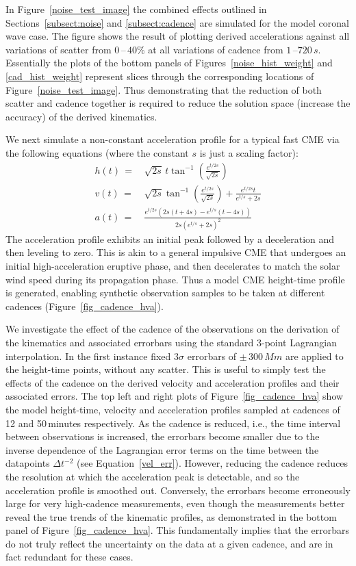 \documentclass[structabstract]{aa}
\begin{document}
In Figure~\ref{noise_test_image} the combined effects outlined in Sections~\ref{subsect:noise} and \ref{subsect:cadence} are simulated for the model coronal wave case. The figure shows the result of plotting derived accelerations against all variations of scatter from $0$\,--\,$40\%$ at all variations of cadence from $1$\,--$720\,s$. Essentially the plots of the bottom panels of Figures~\ref{noise_hist_weight} and \ref{cad_hist_weight} represent slices through the corresponding locations of Figure~\ref{noise_test_image}. Thus demonstrating that the reduction of both scatter and cadence together is required to reduce the solution space (increase the accuracy) of the derived kinematics.

We next simulate a non-constant acceleration profile for a typical fast CME via the following equations (where the constant $s$ is just a scaling factor):
\begin{eqnarray}
h(t)\,=&\,\sqrt{2s}\,t\tan^{-1}\left(\frac{e^{t/2s}}{\sqrt{2s}}\right) \\
v(t)\,=&\,\sqrt{2s}\tan^{-1}\left(\frac{e^{t/2s}}{\sqrt{2s}}\right)+\frac{e^{t/2s}t}{e^{t/s}+2s} \\
a(t)\,=&\,\frac{e^{t/2s}\left(2s\left(t+4s\right)-e^{t/s}\left(t-4s\right)\right)}{2s\left(e^{t/s}+2s\right)^2}
\label{eqn:nonconst_a}
\end{eqnarray}
The acceleration profile exhibits an initial peak followed by a deceleration and then leveling to zero. This is akin to a general impulsive CME that undergoes an initial high-acceleration eruptive phase, and then decelerates to match the solar wind speed during its propagation phase. Thus a model CME height-time profile is generated, enabling synthetic observation samples to be taken at different cadences (Figure~\ref{fig_cadence_hva}). 

We investigate the effect of the cadence of the observations on the derivation of the kinematics and associated errorbars using the standard 3-point Lagrangian interpolation. In the first instance fixed 3$\sigma$ errorbars of $\pm\,300\,Mm$ are applied to the height-time points, without any scatter. This is useful to simply test the effects of the cadence on the derived velocity and acceleration profiles and their associated errors. The top left and right plots of Figure~\ref{fig_cadence_hva} show the model height-time, velocity and acceleration profiles sampled at cadences of 12 and 50\,minutes respectively. As the cadence is reduced, i.e., the time interval between observations is increased, the errorbars become smaller due to the inverse dependence of the Lagrangian error terms on the time between the datapoints $\Delta t^{-2}$ (see Equation~\ref{vel_err}). However, reducing the cadence reduces the resolution at which the acceleration peak is detectable, and so the acceleration profile is smoothed out. Conversely, the errorbars become erroneously large for very high-cadence measurements, even though the measurements better reveal the true trends of the kinematic profiles, as demonstrated in the bottom panel of Figure~\ref{fig_cadence_hva}. This fundamentally implies that the errorbars do not truly reflect the uncertainty on the data at a given cadence, and are in fact redundant for these cases.
\end{document}
